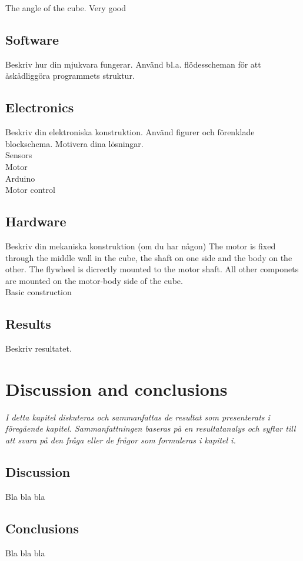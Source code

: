 \documentclass[a4paper,11pt]{kth-mag}
\begin{document}
The angle of the cube. Very good

\section{Software}
Beskriv hur din mjukvara fungerar. Använd bl.a. flödesscheman för att åskådliggöra programmets struktur.

\section{Electronics}
Beskriv din elektroniska konstruktion. Använd figurer och förenklade blockschema. Motivera dina lösningar.
\\ Sensors
\\ Motor
\\ Arduino
\\ Motor control


\section{Hardware}
Beskriv din mekaniska konstruktion (om du har någon)
The motor is fixed through the middle wall in the cube, the shaft on one side and the body on the other. The flywheel is dicrectly mounted to the motor shaft. All other componets are mounted on the motor-body side of the cube.
\\ Basic construction

\section{Results}
Beskriv resultatet.


\chapter{Discussion and conclusions}
\emph{I detta kapitel diskuteras och sammanfattas de resultat som presenterats i föregående kapitel. Sammanfattningen baseras på en resultatanalys och syftar till att svara på den fråga eller de frågor som formuleras i kapitel i.}

\section{Discussion}
Bla bla bla

\section{Conclusions}
Bla bla bla
\end{document}
